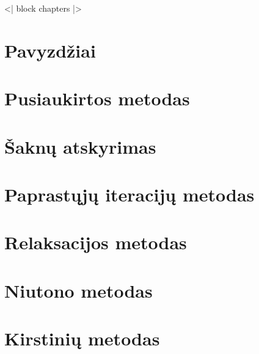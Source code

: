 <| block chapters |>
\newcommand{\cinput}[1]{}

\cinput{01.tex}   %

\section{Pavyzdžiai}
\cite[16-18]{textbook}
\section{Pusiaukirtos metodas}
\cite[19-22]{textbook}
\section{Šaknų atskyrimas}
\cite[23-25]{textbook}
\section{Paprastųjų iteracijų metodas}
\cite[26-31]{textbook}
\section{Relaksacijos metodas}
\cite[34-35]{textbook}
\section{Niutono metodas}
\cite[36-39]{textbook}
\section{Kirstinių metodas}
\cite[40-42]{textbook}


